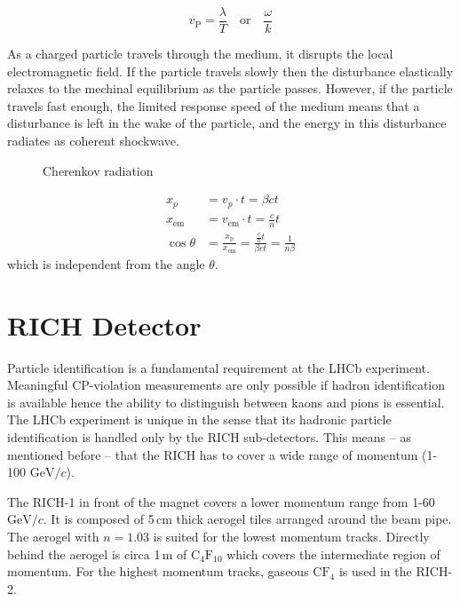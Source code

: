 \documentclass[10pt,twoside]{scrreprt}
\begin{document}
\[ v_{\text{P}} = \frac{\lambda}{T} \quad \text{or} \quad \frac{\omega}{k}\]

As a charged particle travels through the medium, it disrupts the local electromagnetic field. If the particle travels slowly then the disturbance elastically relaxes to the mechinal equilibrium as the particle passes. However, if the particle travels fast enough, the limited response speed of the medium means that a disturbance is left in the wake of the particle, and the energy in this disturbance radiates as coherent shockwave.

\begin{figure}[htbp]
  \centering
  \caption{Cherenkov radiation}
  \label{fig:label}
\end{figure}

\begin{align}
    x_p &= v_{p}\cdot t = \beta c t \nonumber \\
    x_{\text{em}} &= v_{\text{em}}\cdot t=\frac{c}{n}t \nonumber \\
    \cos\theta &= \frac{x_{\text{p}}}{x_{\text{em}}} = \frac{\frac{c}{n}t}{\beta c t} = \frac{1}{n\beta} \nonumber
\end{align}
which is independent from the angle \( \theta \).

\section{RICH Detector} %
\label{sec:rich_detector}

Particle identification is a fundamental requirement at the LHCb experiment. Meaningful CP-violation measurements are only possible if hadron identification is available hence the ability to distinguish between kaons and pions is  essential.
The LHCb experiment is unique in the sense that its hadronic particle identification is handled only by the RICH sub-detectors. This means -- as mentioned before -- that the RICH has to cover a wide range of momentum (1-100 $\text{GeV}/c$).

The RICH-1 in front of the magnet covers a lower momentum range from 1-60 $\text{GeV}/c$. It is composed of 5\,cm thick aerogel tiles arranged around the beam pipe. The aerogel with $n=1.03$ is suited for the lowest momentum tracks. Directly behind the aerogel is circa 1\,m of $\text{C}_4\text{F}_{10}$ which covers the intermediate region of momentum.
For the highest momentum tracks, gaseous $\text{C}\text{F}_4$ is used in the RICH-2.
\end{document}
